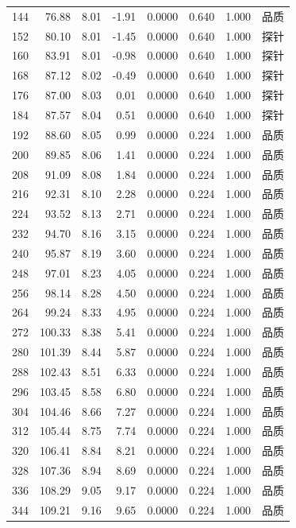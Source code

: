 \begin{longtable}{rrrrrrrr}
144 & 76.88 & 8.01 & -1.91 & 0.0000 & 0.640 & 1.000 & 品质 \\
152 & 80.10 & 8.01 & -1.45 & 0.0000 & 0.640 & 1.000 & 探针 \\
160 & 83.91 & 8.01 & -0.98 & 0.0000 & 0.640 & 1.000 & 探针 \\
168 & 87.12 & 8.02 & -0.49 & 0.0000 & 0.640 & 1.000 & 探针 \\
176 & 87.00 & 8.03 & 0.01 & 0.0000 & 0.640 & 1.000 & 探针 \\
184 & 87.57 & 8.04 & 0.51 & 0.0000 & 0.640 & 1.000 & 探针 \\
192 & 88.60 & 8.05 & 0.99 & 0.0000 & 0.224 & 1.000 & 品质 \\
200 & 89.85 & 8.06 & 1.41 & 0.0000 & 0.224 & 1.000 & 品质 \\
208 & 91.09 & 8.08 & 1.84 & 0.0000 & 0.224 & 1.000 & 品质 \\
216 & 92.31 & 8.10 & 2.28 & 0.0000 & 0.224 & 1.000 & 品质 \\
224 & 93.52 & 8.13 & 2.71 & 0.0000 & 0.224 & 1.000 & 品质 \\
232 & 94.70 & 8.16 & 3.15 & 0.0000 & 0.224 & 1.000 & 品质 \\
240 & 95.87 & 8.19 & 3.60 & 0.0000 & 0.224 & 1.000 & 品质 \\
248 & 97.01 & 8.23 & 4.05 & 0.0000 & 0.224 & 1.000 & 品质 \\
256 & 98.14 & 8.28 & 4.50 & 0.0000 & 0.224 & 1.000 & 品质 \\
264 & 99.24 & 8.33 & 4.95 & 0.0000 & 0.224 & 1.000 & 品质 \\
272 & 100.33 & 8.38 & 5.41 & 0.0000 & 0.224 & 1.000 & 品质 \\
280 & 101.39 & 8.44 & 5.87 & 0.0000 & 0.224 & 1.000 & 品质 \\
288 & 102.43 & 8.51 & 6.33 & 0.0000 & 0.224 & 1.000 & 品质 \\
296 & 103.45 & 8.58 & 6.80 & 0.0000 & 0.224 & 1.000 & 品质 \\
304 & 104.46 & 8.66 & 7.27 & 0.0000 & 0.224 & 1.000 & 品质 \\
312 & 105.44 & 8.75 & 7.74 & 0.0000 & 0.224 & 1.000 & 品质 \\
320 & 106.41 & 8.84 & 8.21 & 0.0000 & 0.224 & 1.000 & 品质 \\
328 & 107.36 & 8.94 & 8.69 & 0.0000 & 0.224 & 1.000 & 品质 \\
336 & 108.29 & 9.05 & 9.17 & 0.0000 & 0.224 & 1.000 & 品质 \\
344 & 109.21 & 9.16 & 9.65 & 0.0000 & 0.224 & 1.000 & 品质 \\

\end{longtable}
